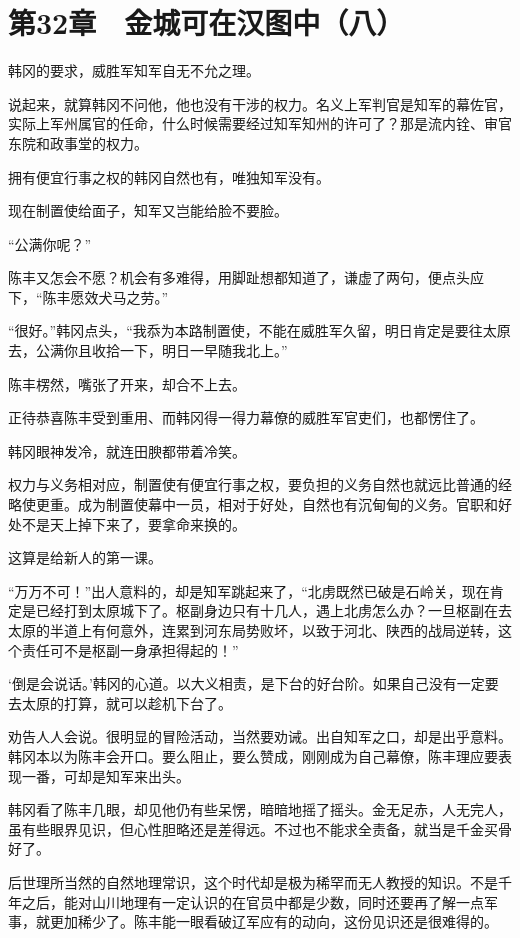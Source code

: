 \section{第32章　金城可在汉图中（八）}

韩冈的要求，威胜军知军自无不允之理。

说起来，就算韩冈不问他，他也没有干涉的权力。名义上军判官是知军的幕佐官，实际上军州属官的任命，什么时候需要经过知军知州的许可了？那是流内铨、审官东院和政事堂的权力。

拥有便宜行事之权的韩冈自然也有，唯独知军没有。

现在制置使给面子，知军又岂能给脸不要脸。

“公满你呢？”

陈丰又怎会不愿？机会有多难得，用脚趾想都知道了，谦虚了两句，便点头应下，“陈丰愿效犬马之劳。”

“很好。”韩冈点头，“我忝为本路制置使，不能在威胜军久留，明日肯定是要往太原去，公满你且收拾一下，明日一早随我北上。”

陈丰楞然，嘴张了开来，却合不上去。

正待恭喜陈丰受到重用、而韩冈得一得力幕僚的威胜军官吏们，也都愣住了。

韩冈眼神发冷，就连田腴都带着冷笑。

权力与义务相对应，制置使有便宜行事之权，要负担的义务自然也就远比普通的经略使更重。成为制置使幕中一员，相对于好处，自然也有沉甸甸的义务。官职和好处不是天上掉下来了，要拿命来换的。

这算是给新人的第一课。

“万万不可！”出人意料的，却是知军跳起来了，“北虏既然已破是石岭关，现在肯定是已经打到太原城下了。枢副身边只有十几人，遇上北虏怎么办？一旦枢副在去太原的半道上有何意外，连累到河东局势败坏，以致于河北、陕西的战局逆转，这个责任可不是枢副一身承担得起的！”

‘倒是会说话。’韩冈的心道。以大义相责，是下台的好台阶。如果自己没有一定要去太原的打算，就可以趁机下台了。

劝告人人会说。很明显的冒险活动，当然要劝诫。出自知军之口，却是出乎意料。韩冈本以为陈丰会开口。要么阻止，要么赞成，刚刚成为自己幕僚，陈丰理应要表现一番，可却是知军来出头。

韩冈看了陈丰几眼，却见他仍有些呆愣，暗暗地摇了摇头。金无足赤，人无完人，虽有些眼界见识，但心性胆略还是差得远。不过也不能求全责备，就当是千金买骨好了。

后世理所当然的自然地理常识，这个时代却是极为稀罕而无人教授的知识。不是千年之后，能对山川地理有一定认识的在官员中都是少数，同时还要再了解一点军事，就更加稀少了。陈丰能一眼看破辽军应有的动向，这份见识还是很难得的。

